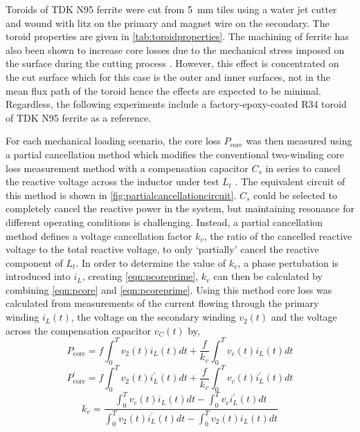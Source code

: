 \documentclass[conference]{IEEEtran}
\begin{document}
Toroids of TDK N95 ferrite were cut from \SI{5}{\milli\meter} tiles using a water jet cutter and wound with litz on the primary and magnet wire on the secondary. 
The toroid properties are given in \cref{tab:toroidproperties}.
The machining of ferrite has also been shown to increase core losses due to the mechanical stress imposed on the surface during the cutting process \cite{neumayrOriginQuantificationIncreased2019}. 
However, this effect is concentrated on the cut surface which for this case is the outer and inner surfaces, not in the mean flux path of the toroid hence the effects are expected to be minimal. 
Regardless, the following experiments include a factory-epoxy-coated R34 toroid of TDK N95 ferrite as a reference. 

For each mechanical loading scenario, the core loss $P_\text{core}$ was then measured using a partial cancellation method which modifies the conventional two-winding core loss measurement method with a compensation capacitor $C_s$ in series to cancel the reactive voltage across the inductor under test $L_t$ \cite{houNewHighFrequencyCore2017}. 
The equivalent circuit of this method is shown in \cref{fig:partialcancellationcircuit}.
$C_s$ could be selected to completely cancel the reactive power in the system, but maintaining resonance for different operating conditions is challenging. 
Instead, a partial cancellation method defines a voltage cancellation factor $k_v$, the ratio of the cancelled reactive voltage to the total reactive voltage, to only `partially' cancel the reactive component of $L_t$. 
In order to determine the value of $k_v$, a phase pertubation is introduced into $i_L$, creating \cref{eqn:pcoreprime}, $k_v$ can then be calculated by combining \cref{eqn:pcore} and \cref{eqn:pcoreprime}.
Using this method core loss was calculated from measurements of the current flowing through the primary winding $i_L(t)$, the voltage on the secondary winding $v_2(t)$ and the voltage across the compensation capacitor $v_C(t)$ by, 
\begin{equation}
  P_\text{core} = f \int_0^T v_2(t)i_L(t)dt + \frac{f}{k_v} \int_0^T v_c(t)i_L(t) dt
  \label{eqn:pcore}
\end{equation}
\begin{equation}
  P_\text{core}^{\prime} = f \int_0^T v_2(t)i_L^{\prime} (t)dt + \frac{f}{k_v} \int_0^T v_c(t)i_L^{\prime}(t) dt
  \label{eqn:pcoreprime}
\end{equation}
\begin{equation}
  k_v = \frac{\int_0^T v_c(t)i_L(t)dt - \int_0^T v_ci_L^\prime(t)dt}{\int_0^T v_2(t) i_L^\prime(t) dt - \int_0^T v_2(t) i_L(t) dt}
  \label{eqn:kv}
\end{equation}
\end{document}
